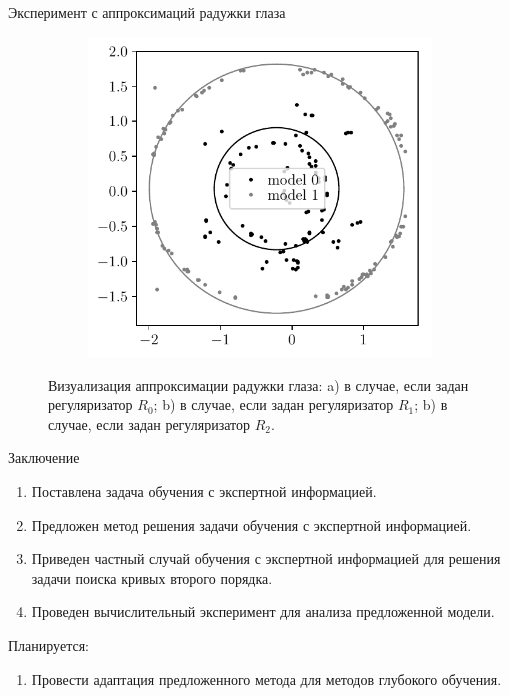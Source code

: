 \documentclass[10pt,pdf,hyperref={unicode}]{beamer}
\begin{document}
\begin{frame}{Эксперимент с аппроксимаций радужки глаза}
\begin{figure}
\begin{subfigure}[b]{0.3\textwidth}
         \caption{}
     \end{subfigure}
     \begin{subfigure}[b]{0.3\textwidth}
         \centering
         \includegraphics[width=\textwidth]{figures/prior_regular_real_example}
         \caption{}
     \end{subfigure}
     \caption{Визуализация аппроксимации радужки глаза: a) в случае, если задан регуляризатор $R_0$; b) в случае, если задан регуляризатор $R_1$; b) в случае, если задан регуляризатор $R_2$.}
    \label{ce:fig6}
\end{figure}

\end{frame}

\begin{frame}{Заключение}
\justifying
	\begin{enumerate}
	\justifying
		\item Поставлена задача обучения с экспертной информацией.
		\item Предложен метод решения задачи обучения с экспертной информацией.
		\item Приведен частный случай обучения с экспертной информацией для решения задачи поиска кривых второго порядка.
		\item Проведен вычислительный эксперимент для анализа предложенной модели.
	\end{enumerate}

Планируется:
	\begin{enumerate}
	\justifying
		\item Провести адаптация предложенного метода для методов глубокого обучения.
	\end{enumerate}	

\end{frame}
\end{document}
